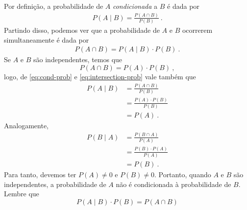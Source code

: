 \documentclass{article}
\begin{document}
            Por definição, a probabilidade de $A$ \emph{condicionada} a $B$ é dada por
            \begin{equation}
            \label{eq:cond-prob}
            \begin{aligned}
                P(A \mid B) = \frac{P(A \cap B)}{P(B)}\ .
            \end{aligned}
            \end{equation}
            Partindo disso, podemos ver que a probabilidade de $A$ e $B$ ocorrerem simultaneamente é dada por
            \begin{equation}
            \label{eq:intersection-prob}
            \begin{aligned}
                P(A \cap B) = P(A \mid B) \cdot P(B)\ .
            \end{aligned}
            \end{equation}
            Se $A$ e $B$ são independentes, temos que
            \begin{equation*}
                P(A \cap B) = P(A) \cdot P(B)\ ,
            \end{equation*}
            logo, de \eqref{eq:cond-prob} e \eqref{eq:intersection-prob} vale também que
            \begin{equation*}
            \begin{aligned}
                P(A \mid B) & = \frac{P(A \cap B)}{P(B)}\\
                & = \frac{P(A) \cdot P(B)}{P(B)}\\
                & = P(A)\ .
            \end{aligned}
            \end{equation*}
            Analogamente, 
            \begin{equation*}
            \begin{aligned}
                P(B \mid A) & = \frac{P(B \cap A)}{P(A)}\\
                & = \frac{P(B) \cdot P(A)}{P(A)}\\
                & = P(B)\ .
            \end{aligned}
            \end{equation*}
            Para tanto, devemos ter $P(A) \neq 0$ e $P(B) \neq 0$. Portanto, quando $A$ e $B$ são independentes, a probabilidade de $A$ não é condicionada à probabilidade de $B$. Lembre que
            \begin{equation*}
                P(A \mid B) \cdot P(B) = P(A \cap B)
            \end{equation*}
\end{document}
